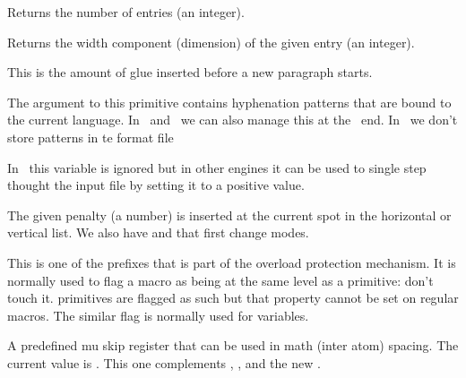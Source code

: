 \stopoldprimitive

\startoldprimitive[title={\prm {parshapelength}}]

Returns the number of entries (an integer).

\stopoldprimitive

\startnewprimitive[title={\prm {parshapewidth}}]

Returns the width component (dimension) of the given entry (an integer).

\stopnewprimitive

\startoldprimitive[title={\prm {parskip}}]

This is the amount of glue inserted before a new paragraph starts.

\stopoldprimitive

\startoldprimitive[title={\prm {patterns}}]

The argument to this primitive contains hyphenation patterns that are bound to
the current language. In \LUATEX\ and \LUAMETATEX\ we can also manage this at the
\LUA\ end. In \LUAMETATEX\ we don't store patterns in te format file

\stopoldprimitive

\startoldprimitive[title={\prm {pausing}}][obsolete=yes]

In \LUAMETATEX\ this variable is ignored but in other engines it can be used to
single step thought the input file by setting it to a positive value.

\stopoldprimitive

\startoldprimitive[title={\prm {penalty}}]

The given penalty (a number) is inserted at the current spot in the horizontal or
vertical list. We also have  and  that first change
modes.

\stopoldprimitive

\startnewprimitive[title={\prm {permanent}}]

This is one of the prefixes that is part of the overload protection mechanism. It
is normally used to flag a macro as being at the same level as a primitive: don't
touch it. primitives are flagged as such but that property cannot be set on
regular macros. The similar  flag is normally used for variables.

\stopnewprimitive

\startnewprimitive[title={\prm {pettymuskip}}]

A predefined mu skip register that can be used in math (inter atom) spacing. The
current value is {\tt \the\pettymuskip}. This one complements ,
,  and the new .

